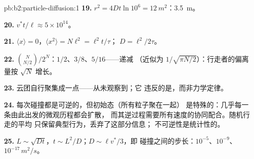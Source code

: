 \begin{solution}{pb:b2:particle-diffusion:1}
\textbf{19.} $r^2 = 4Dt\ln 10^6 = \qty{12}{m^2}$：\qty{3.5}{m}。

\textbf{20.} $v^*t/\ell \approx 5 \times 10^{14}$。

\textbf{21.} $\langle x\rangle = 0$，$\langle x^2\rangle = N\ell^2 = \ell^2 t/\tau$；
$D = \ell^2/2\tau$。

\textbf{22.} $\binom{N}{N/2}/2^N$：$1/2$、$3/8$、$5/16$——递减
（近似为 $1/\sqrt{\pi N/2}$）：行走者的偏离量按 $\sqrt N$ 增长。

\textbf{23.} 云团自行聚集成一点——从未观察到；它
违反的是，而非力学定律。

\textbf{24.} 每次碰撞都是可逆的，但初始态（所有粒子聚在一起）
是特殊的：几乎每一条由此出发的微观历程都会扩散，
而其逆过程需要所有速度的协同配合。随机行走的平均
只保留典型行为，丢弃了这部分信息；
不可逆性是统计性的。

\textbf{25.} $L \sim \sqrt{Dt}$，$t \sim L^2/D$；$D \sim \ell v^*/3$，即
碰撞之间的步长：$10^{-5}$、$10^{-9}$、$10^{-17}\,\unit{m^2/s}$。
\end{solution}
